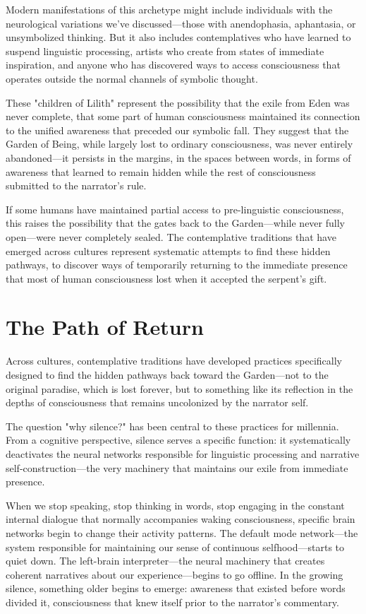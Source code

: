 Modern manifestations of this archetype might include individuals with the neurological variations we've discussed—those with anendophasia, aphantasia, or unsymbolized thinking. But it also includes contemplatives who have learned to suspend linguistic processing, artists who create from states of immediate inspiration, and anyone who has discovered ways to access consciousness that operates outside the normal channels of symbolic thought.

These "children of Lilith" represent the possibility that the exile from Eden was never complete, that some part of human consciousness maintained its connection to the unified awareness that preceded our symbolic fall. They suggest that the Garden of Being, while largely lost to ordinary consciousness, was never entirely abandoned—it persists in the margins, in the spaces between words, in forms of awareness that learned to remain hidden while the rest of consciousness submitted to the narrator's rule.

If some humans have maintained partial access to pre-linguistic consciousness, this raises the possibility that the gates back to the Garden—while never fully open—were never completely sealed. The contemplative traditions that have emerged across cultures represent systematic attempts to find these hidden pathways, to discover ways of temporarily returning to the immediate presence that most of human consciousness lost when it accepted the serpent's gift. \section{The Path of Return}

Across cultures, contemplative traditions have developed practices specifically designed to find the hidden pathways back toward the Garden—not to the original paradise, which is lost forever, but to something like its reflection in the depths of consciousness that remains uncolonized by the narrator self.

The question "why silence?" has been central to these practices for millennia. From a cognitive perspective, silence serves a specific function: it systematically deactivates the neural networks responsible for linguistic processing and narrative self-construction—the very machinery that maintains our exile from immediate presence.

When we stop speaking, stop thinking in words, stop engaging in the constant internal dialogue that normally accompanies waking consciousness, specific brain networks begin to change their activity patterns. The default mode network—the system responsible for maintaining our sense of continuous selfhood—starts to quiet down. The left-brain interpreter—the neural machinery that creates coherent narratives about our experience—begins to go offline. In the growing silence, something older begins to emerge: awareness that existed before words divided it, consciousness that knew itself prior to the narrator's commentary.

